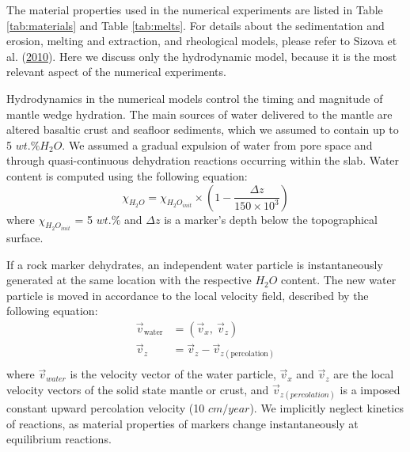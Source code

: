 The material properties used in the numerical experiments are listed in Table \ref{tab:materials} and Table \ref{tab:melts}. For details about the sedimentation and erosion, melting and extraction, and rheological models, please refer to Sizova et al. (\protect\hyperlink{ref-sizova2010}{2010}). Here we discuss only the hydrodynamic model, because it is the most relevant aspect of the numerical experiments.

Hydrodynamics in the numerical models control the timing and magnitude of mantle wedge hydration. The main sources of water delivered to the mantle are altered basaltic crust and seafloor sediments, which we assumed to contain up to 5 \(wt.\% H_{2}O\). We assumed a gradual expulsion of water from pore space and through quasi-continuous dehydration reactions occurring within the slab. Water content is computed using the following equation:
\begin{equation}
  \chi_{H_{2}O} = \chi_{H_{2}O_{init}}\times\left(1-\frac{\Delta z}{150\times 10^{3}}\right)
\end{equation}
where \(\chi_{H_{2}O_{init}}\) = 5 \(wt.\%\) and \(\Delta z\) is a marker's depth below the topographical surface.

If a rock marker dehydrates, an independent water particle is instantaneously generated at the same location with the respective \(H_{2}O\) content. The new water particle is moved in accordance to the local velocity field, described by the following equation:
\begin{equation}
  \begin{aligned}
    \vec{v}_{\text{water}} & = (\vec{v}_x,\ \vec{v}_z) \\
    \vec{v}_z & = \vec{v}_z - \vec{v}_{z(\text{percolation})} \\
  \end{aligned}
\end{equation}
where \(\vec{v}_{water}\) is the velocity vector of the water particle, \(\vec{v}_{x}\) and \(\vec{v}_{z}\) are the local velocity vectors of the solid state mantle or crust, and \(\vec{v}_{z(percolation)}\) is a imposed constant upward percolation velocity (10 \(cm/year\)). We implicitly neglect kinetics of reactions, as material properties of markers change instantaneously at equilibrium reactions.

